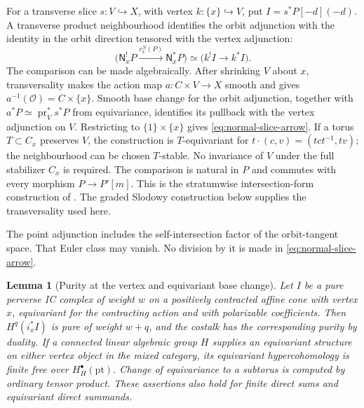 \documentclass[11pt]{amsart}
\newtheorem{lemma}[theorem]{Lemma}
\theoremstyle{definition}
\theoremstyle{remark}
\begin{document}
For a transverse slice $s:V\hookrightarrow X$, with vertex
$k:\{x\}\hookrightarrow V$, put $I=s^*P[-d](-d)$.
A transverse product neighbourhood identifies the orbit adjunction with
the identity in the orbit direction tensored with the vertex adjunction:
\begin{equation}\label{eq:normal-slice-arrow}
 \bigl(\mathsf N_x^!P\xrightarrow{c_x^N(P)}\mathsf N_x^*P\bigr)
 \simeq\bigl(k^!I\longrightarrow k^*I\bigr).
\end{equation}
The comparison can be made algebraically.  After shrinking $V$ about
$x$, transversality makes the action map
$a:C\times V\to X$ smooth and gives $a^{-1}(\mathcal O)=C\times\{x\}$.
Smooth base change for the orbit adjunction, together with
$a^*P\simeq\operatorname{pr}_V^*s^*P$ from equivariance, identifies its
pullback with the vertex adjunction on $V$.  Restricting to
$\{1\}\times\{x\}$ gives \eqref{eq:normal-slice-arrow}.
If a torus $T\subset C_x$ preserves $V$, the construction is
$T$-equivariant for $t\cdot(c,v)=(tct^{-1},tv)$; the neighbourhood can
be chosen $T$-stable.  No invariance of $V$ under the full stabilizer
$C_x$ is required.  The comparison is natural in $P$ and commutes
with every morphism $P\to P'[m]$.  This is the stratumwise
intersection-form construction of
\cite[Lemma~3.9 and Remark~3.12]{JMWParity}.
The graded Slodowy construction below supplies the transversality used here.

The point adjunction includes the self-intersection factor of the
orbit-tangent space.  That Euler class may vanish.  No division by it is
made in \eqref{eq:normal-slice-arrow}.

\begin{lemma}[Purity at the vertex and equivariant base change]
\label{lem:normal-purity-base-change}
Let $I$ be a pure perverse IC complex of weight $w$ on a positively
contracted affine cone with vertex $x$, equivariant for the contracting
action and with polarizable coefficients.
Then $H^q(i_x^*I)$ is pure of weight $w+q$, and the costalk has the
corresponding purity by duality.
If a connected linear algebraic group $H$ supplies an equivariant
structure on either vertex object in the mixed category, its
equivariant hypercohomology is finite free
over $H_H^\bullet(\mathrm{pt})$.  Change of equivariance to a subtorus
is computed by ordinary tensor product.  These assertions also hold for
finite direct sums and equivariant direct summands.
\end{lemma}
\end{document}
